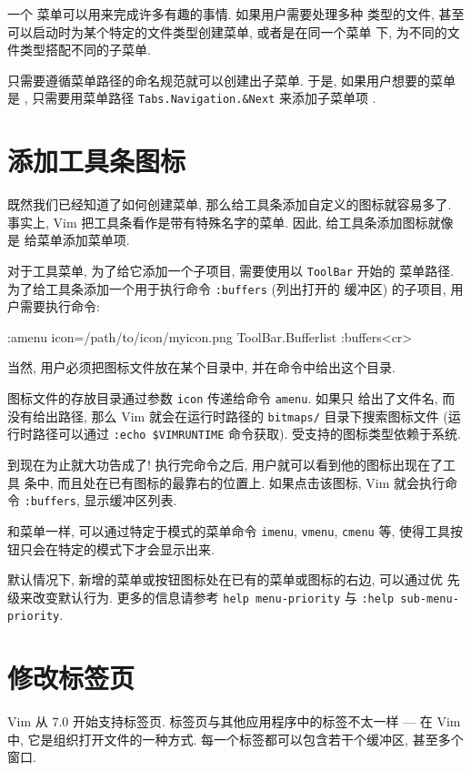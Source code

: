 一个  菜单可以用来完成许多有趣的事情. 如果用户需要处理多种
类型的文件, 甚至可以启动时为某个特定的文件类型创建菜单, 或者是在同一个菜单
下, 为不同的文件类型搭配不同的子菜单.

只需要遵循菜单路径的命名规范就可以创建出子菜单. 于是, 如果用户想要的菜单是
, 只需要用菜单路径
\texttt{Tabs.Navigation.\&Next} 来添加子菜单项 .

\section{添加工具条图标}
\label{sec:adding_toolbar_icons}

既然我们已经知道了如何创建菜单, 那么给工具条添加自定义的图标就容易多了.
事实上, Vim 把工具条看作是带有特殊名字的菜单. 因此, 给工具条添加图标就像是
给菜单添加菜单项.

对于工具菜单, 为了给它添加一个子项目, 需要使用以 \texttt{ToolBar} 开始的
菜单路径. 为了给工具条添加一个用于执行命令 \texttt{:buffers} (列出打开的
缓冲区) 的子项目, 用户需要执行命令:
\begin{vimcmd}
:amenu icon=/path/to/icon/myicon.png ToolBar.Bufferlist :buffers<cr>
\end{vimcmd}
当然, 用户必须把图标文件放在某个目录中, 并在命令中给出这个目录.

图标文件的存放目录通过参数 \texttt{icon} 传递给命令 \texttt{amenu}. 如果只
给出了文件名, 而没有给出路径, 那么 Vim 就会在运行时路径的 \texttt{bitmaps/}
目录下搜索图标文件 (运行时路径可以通过 \texttt{:echo \$VIMRUNTIME}
命令获取). 受支持的图标类型依赖于系统.

到现在为止就大功告成了! 执行完命令之后, 用户就可以看到他的图标出现在了工具
条中, 而且处在已有图标的最靠右的位置上. 如果点击该图标, Vim 就会执行命令
\texttt{:buffers}, 显示缓冲区列表.

和菜单一样, 可以通过特定于模式的菜单命令 \texttt{imenu}, \texttt{vmenu},
\texttt{cmenu} 等, 使得工具按钮只会在特定的模式下才会显示出来.

\begin{warning}
默认情况下, 新增的菜单或按钮图标处在已有的菜单或图标的右边, 可以通过优
先级来改变默认行为. 更多的信息请参考 \texttt{help menu-priority} 与 
\texttt{:help sub-menu-priority}.
\end{warning}

\section{修改标签页}
\label{sec:modifying_tabs}
Vim 从 7.0 开始支持标签页. 标签页与其他应用程序中的标签不太一样 --- 在
Vim 中, 它是组织打开文件的一种方式. 每一个标签都可以包含若干个缓冲区,
甚至多个窗口.

